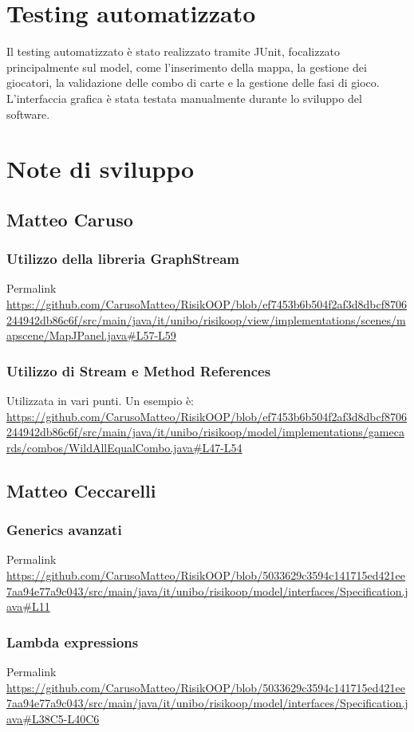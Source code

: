 \documentclass[a4paper,12pt]{report}
\begin{document}
\section{Testing automatizzato}
Il testing automatizzato è stato realizzato tramite JUnit, focalizzato principalmente sul model, come l'inserimento della mappa, la gestione dei giocatori, la validazione delle combo di carte e la gestione delle fasi di gioco.
L'interfaccia grafica è stata testata manualmente durante lo sviluppo del software.

\section{Note di sviluppo}
\subsection{Matteo Caruso}
\subsubsection{Utilizzo della libreria GraphStream}
Permalink \url{https://github.com/CarusoMatteo/RisikOOP/blob/ef7453b6b504f2af3d8dbcf8706244942db86c6f/src/main/java/it/unibo/risikoop/view/implementations/scenes/mapscene/MapJPanel.java#L57-L59}
\subsubsection{Utilizzo di Stream e Method References}
Utilizzata in vari punti. Un esempio è: \url{https://github.com/CarusoMatteo/RisikOOP/blob/ef7453b6b504f2af3d8dbcf8706244942db86c6f/src/main/java/it/unibo/risikoop/model/implementations/gamecards/combos/WildAllEqualCombo.java#L47-L54}

\subsection{Matteo Ceccarelli}
\subsubsection{Generics avanzati}
Permalink \url{https://github.com/CarusoMatteo/RisikOOP/blob/5033629c3594c141715ed421ee7aa94e77a9c043/src/main/java/it/unibo/risikoop/model/interfaces/Specification.java#L11}

\subsubsection{Lambda expressions}
Permalink \url{https://github.com/CarusoMatteo/RisikOOP/blob/5033629c3594c141715ed421ee7aa94e77a9c043/src/main/java/it/unibo/risikoop/model/interfaces/Specification.java#L38C5-L40C6}
\end{document}

